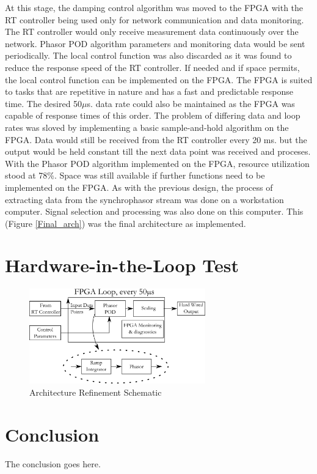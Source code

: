 \documentclass[conference]{IEEEtran}
\begin{document}
At this stage, the damping control algorithm was moved to the FPGA with the RT controller being used only for network communication and data monitoring. The RT controller would only receive measurement data continuously over the network. Phasor POD algorithm parameters and monitoring data would be sent periodically. The local control function was also discarded as it was found to reduce the response speed of the RT controller. If needed and if space permits, the local control function can be implemented on the FPGA. The FPGA is suited to tasks that are repetitive in nature and has a fast and predictable response time. The desired 50$\mu$s. data rate could also be maintained as the FPGA was capable of response times of this order. The problem of differing data and loop rates was sloved by implementing a basic sample-and-hold algorithm on the FPGA. Data would still be received from the RT controller every 20 ms. but the output would be held constant till the next data point was received and proceses. With the Phasor POD algorithm implemented on the FPGA, resource utilization stood at 78\%. Space was still available if further functions need to be implemented on the FPGA. As with the previous design, the process of extracting data from the synchrophasor stream was done on a workstation computer. Signal selection and processing was also done on this computer. This (Figure \ref{Final_arch}) was the final architecture as implemented.\\


\section{Hardware-in-the-Loop Test}

\begin{figure}[!ht]
\centering
\includegraphics[width=3in]{FPGAOnly.png} 
\caption{Architecture Refinement Schematic}
\label{FPGA_Blocks}
\end{figure}

\section{Conclusion}
The conclusion goes here.
\end{document}
